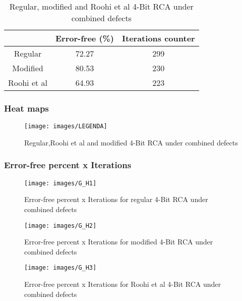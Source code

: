 \begin{table}[h]
\begin{center}
\begin{tabular}{|c|c|c|}
\hline
 & Error-free (\%) & Iterations counter \\
\hline
 Regular & 72.27 & 299 \\
\hline
 Modified & 80.53 & 230 \\
\hline
 Roohi et al & 64.93 & 223 \\
\hline

\end{tabular}
\caption{Regular, modified and Roohi et al 4-Bit RCA under combined defects}
\end{center}
\end{table}

\pagebreak
\subsubsection{Heat maps}

\flushleft

\begin{figure}[h!]
\center
{}
\linebreak
{}
\linebreak
{}
\linebreak
{\texttt{[image: images/LEGENDA]}
}
\caption{Regular,Roohi et al and modified 4-Bit RCA under combined defects}
\label{figure:RCA_t1}
\end{figure}

\pagebreak
\subsubsection{Error-free percent x Iterations}

\begin{figure}[h!]
\center
\texttt{[image: images/G\_H1]}
\caption{Error-free percent x Iterations for regular 4-Bit RCA under combined defects}
\label{figure:RCA_reg_gt1}
\end{figure}

\begin{figure}[h!]
\center
\texttt{[image: images/G\_H2]}
\caption{Error-free percent x Iterations for modified 4-Bit RCA under combined defects}
\label{figure:RCA_mod1_gt1}
\end{figure}

\begin{figure}[h!]
\center
\texttt{[image: images/G\_H3]}
\caption{Error-free percent x Iterations for Roohi et al 4-Bit RCA under combined defects}
\label{figure:RCA_mod2_gt1}
\end{figure}
